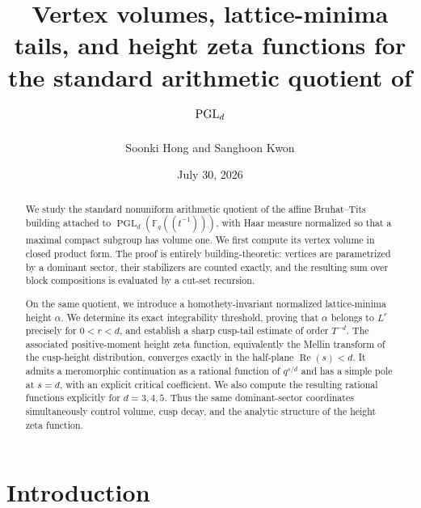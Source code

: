 \documentclass[11pt]{amsart}
\title[Vertex volumes and height zeta functions for $\PGL_d$]{Vertex volumes, lattice-minima tails, and height zeta functions for the standard arithmetic quotient of $\PGL_d$}
\author{Soonki Hong and Sanghoon Kwon}
\date{July 30, 2026}
\newcommand{\PGL}{\operatorname{PGL}}
\theoremstyle{plain}
\theoremstyle{definition}
\numberwithin{equation}{section}
\begin{document}
\begin{abstract}
We study the standard nonuniform arithmetic quotient of the affine
Bruhat--Tits building attached to
\(\PGL_d(\mathbb F_q(\!(t^{-1})\!))\), with Haar measure normalized so
that a maximal compact subgroup has volume one.  We first compute its
vertex volume in closed product form.  The proof is entirely
building-theoretic: vertices are parametrized by a dominant sector,
their stabilizers are counted exactly, and the resulting sum over
block compositions is evaluated by a cut-set recursion.

On the same quotient, we introduce a homothety-invariant normalized
lattice-minima height \(\alpha\).  We determine its exact integrability
threshold, proving that \(\alpha\) belongs to \(L^r\) precisely for
\(0<r<d\), and establish a sharp cusp-tail estimate of order
\(T^{-d}\).  The associated positive-moment height zeta function,
equivalently the Mellin transform of the cusp-height distribution,
converges exactly in the half-plane
\(\operatorname{Re}(s)<d\).  It admits a meromorphic continuation as a
rational function of \(q^{s/d}\) and has a simple pole at \(s=d\), with
an explicit critical coefficient.  We also compute the resulting
rational functions explicitly for \(d=3,4,5\).  Thus the same
dominant-sector coordinates simultaneously control volume, cusp
decay, and the analytic structure of the height zeta function.
\end{abstract}


\maketitle
\tableofcontents




\section{Introduction}
\end{document}
